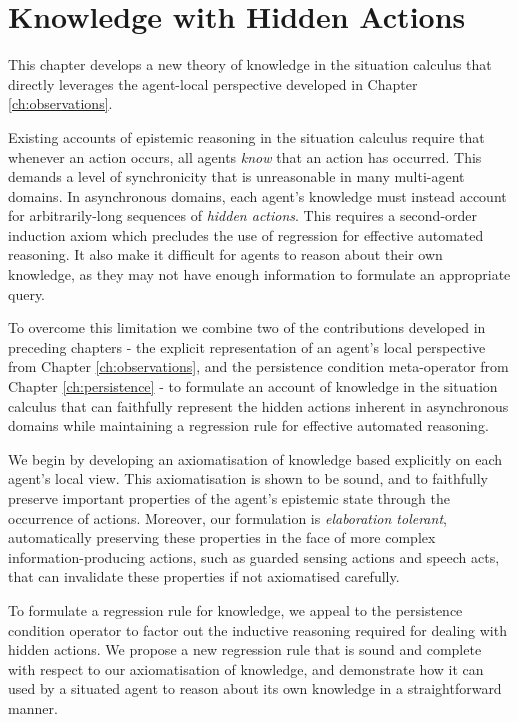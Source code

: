 

\chapter{Knowledge with Hidden Actions}

\label{ch:knowledge}

This chapter develops a new theory of knowledge in the situation calculus
that directly leverages the agent-local perspective developed in Chapter
\ref{ch:observations}.

Existing accounts of epistemic reasoning in the situation calculus
require that whenever an action occurs, all agents \emph{know} that
an action has occurred. This demands a level of synchronicity that
is unreasonable in many multi-agent domains. In asynchronous domains,
each agent's knowledge must instead account for arbitrarily-long sequences
of \emph{hidden actions}. This requires a second-order induction axiom
which precludes the use of regression for effective automated reasoning.
It also make it difficult for agents to reason about their own knowledge,
as they may not have enough information to formulate an appropriate
query.

To overcome this limitation we combine two of the contributions developed
in preceding chapters - the explicit representation of an agent's
local perspective from Chapter \ref{ch:observations}, and the persistence
condition meta-operator from Chapter \ref{ch:persistence} - to formulate
an account of knowledge in the situation calculus that can faithfully
represent the hidden actions inherent in asynchronous domains while
maintaining a regression rule for effective automated reasoning.

We begin by developing an axiomatisation of knowledge based explicitly
on each agent's local view. This axiomatisation is shown to be sound,
and to faithfully preserve important properties of the agent's epistemic
state through the occurrence of actions. Moreover, our formulation
is \emph{elaboration tolerant}, automatically preserving these properties
in the face of more complex information-producing actions, such as
guarded sensing actions and speech acts, that can invalidate these
properties if not axiomatised carefully.

To formulate a regression rule for knowledge, we appeal to the persistence
condition operator to factor out the inductive reasoning required
for dealing with hidden actions. We propose a new regression rule
that is sound and complete with respect to our axiomatisation of knowledge,
and demonstrate how it can used by a situated agent to reason about
its own knowledge in a straightforward manner.

